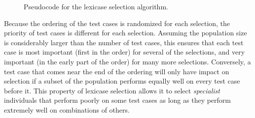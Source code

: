 \documentclass{sig-alternate}
\begin{document}
\begin{figure}%
\centering
{}
\caption{\label{lexicase}Pseudocode for the lexicase selection algorithm.}
\end{figure}

Because the ordering of the test cases is randomized for each selection, the priority of test cases is different for each selection. Assuming the population size is considerably larger than the number of test cases, this ensures that each test case is most important (first in the order) for several of the selections, and very important (in the early part of the order) for many more selections. Conversely, a test case that comes near the end of the ordering will only have impact on selection if a subset of the population performs equally well on every test case before it. This property of lexicase selection allows it to select \textit{specialist} individuals that perform poorly on some test cases as long as they perform extremely well on combinations of others.
\end{document}

